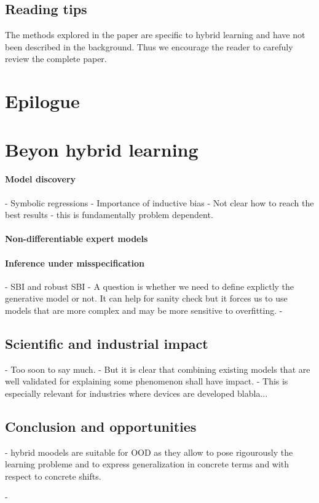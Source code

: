 \subsection{Reading tips}
The methods explored in the paper are specific to hybrid learning and have not been described in the background. Thus we encourage the reader to carefuly review the complete paper.



\section{Epilogue}
\section{Beyon hybrid learning}
\paragraph{Model discovery}
- Symbolic regressions
- Importance of inductive bias
- Not clear how to reach the best results - this is fundamentally problem dependent.

\paragraph{Non-differentiable expert models}

\paragraph{Inference under misspecification}
 - SBI and robust SBI
 - A question is whether we need to define explictly the generative model or not. It can help for sanity check but it forces us to use models that are more complex and may be more sensitive to overfitting.
 -
\subsection{Scientific and industrial impact}
 - Too soon to say much.
 - But it is clear that combining existing models that are well validated for explaining some phenomenon shall have impact.
 - This is especially relevant for industries where devices are developed blabla...
\subsection{Conclusion and opportunities}
- hybrid moodels are suitable for OOD as they allow to pose rigourously the learning probleme and to express generalization in concrete terms and with respect to concrete shifts.

- 
